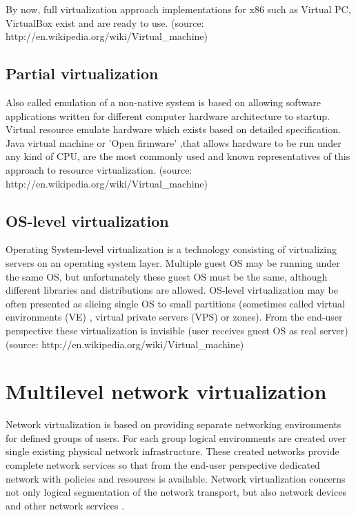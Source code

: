 \documentclass[11pt]{book}
\begin{document}
        By now, full virtualization approach implementations for x86 such as Virtual PC, VirtualBox exist and are ready
        to use. (source: http://en.wikipedia.org/wiki/Virtual\_machine)


      \subsection{Partial virtualization}

        Also called emulation of a non-native system is based on allowing software applications written for different
        computer hardware architecture to startup. Virtual resource emulate hardware which exists based on detailed
        specification.  Java virtual machine or 'Open firmware' ,that allows hardware to be run under any kind of CPU,
        are the most commonly used and known representatives of this approach to resource virtualization. (source:
        http://en.wikipedia.org/wiki/Virtual\_machine)


      \subsection{OS-level virtualization}

        Operating System-level virtualization is a technology consisting of virtualizing servers on an operating system
        layer.  Multiple guest OS may be running under the same OS, but unfortunately these guest OS must be the same,
        although different libraries and distributions are allowed. OS-level virtualization may be often presented as
        slicing single OS to small partitions (sometimes called virtual environments (VE) , virtual private servers
        (VPS)  or zones). From the end-user perspective these virtualization is invisible (user receives guest OS as
        real server) (source: http://en.wikipedia.org/wiki/Virtual\_machine)


    \section{Multilevel network virtualization}
    \label{sec:ctx:multi}

      Network virtualization is based on providing separate networking environments for defined groups of users. For
      each group logical environments are created over single existing physical network infrastructure. These created
      networks provide complete network services so that from the end-user perspective dedicated network with policies
      and resources is available. Network virtualization concerns not only logical segmentation of the network
      transport, but also network devices and other network services \cite{network_virt}.
\end{document}
